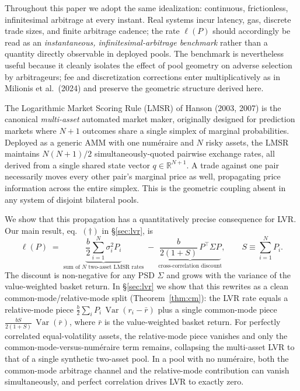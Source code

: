 \documentclass[11pt]{article}
\DeclareMathOperator{\Var}{Var}
\newcommand{\R}{\mathbb{R}}
\newcommand{\transp}{^{\!\top}}
\begin{document}
Throughout this paper we adopt the same idealization: continuous, frictionless, infinitesimal arbitrage at every instant. Real systems incur latency, gas, discrete trade sizes, and finite arbitrage cadence; the rate $\ell(P)$ should accordingly be read as an \emph{instantaneous, infinitesimal-arbitrage benchmark} rather than a quantity directly observable in deployed pools. The benchmark is nevertheless useful because it cleanly isolates the effect of pool geometry on adverse selection by arbitrageurs; fee and discretization corrections enter multiplicatively as in Milionis et al.\ (2024) and preserve the geometric structure derived here.

The Logarithmic Market Scoring Rule (LMSR) of Hanson (2003, 2007) is the canonical \emph{multi-asset} automated market maker, originally designed for prediction markets where $N+1$ outcomes share a single simplex of marginal probabilities. Deployed as a generic AMM with one num\'eraire and $N$ risky assets, the LMSR maintains $N(N+1)/2$ simultaneously-quoted pairwise exchange rates, all derived from a single shared state vector $q \in \R^{N+1}$. A trade against one pair necessarily moves every other pair's marginal price as well, propagating price information across the entire simplex. This is the geometric coupling absent in any system of disjoint bilateral pools.

We show that this propagation has a quantitatively precise consequence for LVR. Our main result, eq.~$(\dagger)$ in \S\ref{sec:lvr}, is
\[
\ell(P) \;=\; \underbrace{\frac{b}{2}\sum_{i=1}^N \sigma_i^2 P_i}_{\text{sum of $N$ two-asset LMSR rates}} \;-\; \underbrace{\frac{b}{2(1+S)}\,P\transp\Sigma P}_{\text{cross-correlation discount}}, \qquad S \equiv \sum_{i=1}^N P_i.
\]
The discount is non-negative for any PSD $\Sigma$ and grows with the variance of the value-weighted basket return. In \S\ref{sec:lvr} we show that this rewrites as a clean common-mode/relative-mode split (Theorem~\ref{thm:cm}): the LVR rate equals a relative-mode piece $\tfrac{b}{2}\sum_i P_i\,\Var(r_i - \bar r)$ plus a single common-mode piece $\tfrac{bS}{2(1+S)}\,\Var(\bar r)$, where $\bar r$ is the value-weighted basket return. For perfectly correlated equal-volatility assets, the relative-mode piece vanishes and only the common-mode-versus-num\'eraire term remains, collapsing the multi-asset LVR to that of a single synthetic two-asset pool. In a pool with no num\'eraire, both the common-mode arbitrage channel and the relative-mode contribution can vanish simultaneously, and perfect correlation drives LVR to exactly zero.
\end{document}
